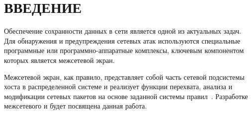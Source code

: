 \section*{ВВЕДЕНИЕ}

Обеспечение сохранности данных в сети является одной из актуальных задач. Для обнаружения и предупреждения сетевых атак используются специальные программные или программно-аппаратные комплексы, ключевым компонентом которых является межсетевой экран.


Межсетевой экран, как правило, представляет собой часть сетевой подсистемы хоста в распределенной системе и реализует функции перехвата, анализа и модификации сетевых пакетов на основе заданной системы правил~\cite{b0}. Разработке межсетевого и будет посвящена данная работа.


























